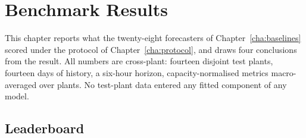 \chapter{Benchmark Results}
\label{cha:benchmark}

This chapter reports what the twenty-eight forecasters of Chapter~\ref{cha:baselines}
scored under the protocol of Chapter~\ref{cha:protocol}, and draws four conclusions from
the result. All numbers are cross-plant: fourteen disjoint test plants, fourteen days of
history, a six-hour horizon, capacity-normalised metrics macro-averaged over plants. No
test-plant data entered any fitted component of any model.

\section{Leaderboard}
\label{sec:leaderboard}

